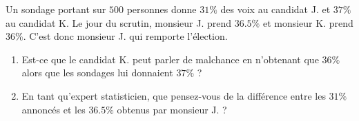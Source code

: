 
\begin{exercice}\label{exosmath-0417}

    Un sondage portant sur \( 500\) personnes donne \( 31\%\) des voix au candidat J. et \( 37\%\) au candidat K. Le jour du scrutin, monsieur J. prend \(36.5\% \) et monsieur K. prend \( 36\%\). C'est donc monsieur J. qui remporte l'élection.
    \begin{enumerate}
        \item
            Est-ce que le candidat K. peut parler de malchance en n'obtenant que \( 36\%\) alors que les sondages lui donnaient \( 37\%\) ?
        \item
            En tant qu'expert statisticien, que pensez-vous de la différence entre les \( 31\%\) annoncés et les \( 36.5\%\) obtenus par monsieur J. ?
    \end{enumerate}

\end{exercice}
